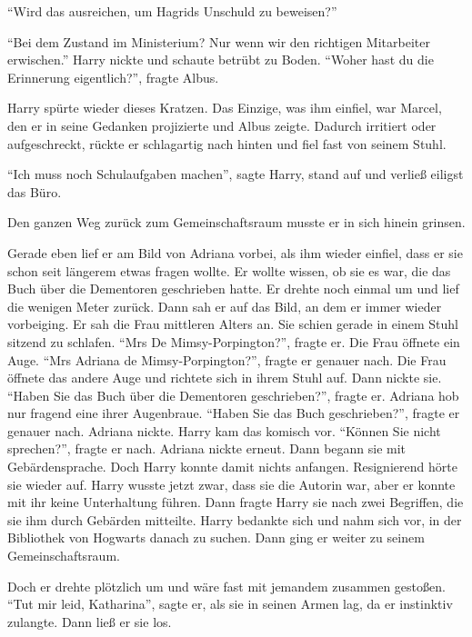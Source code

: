 \enquote{Wird das ausreichen, um Hagrids Unschuld zu beweisen?}

\enquote{Bei dem Zustand im Ministerium? Nur wenn wir den richtigen Mitarbeiter erwischen.} Harry nickte und schaute betrübt zu Boden. \enquote{Woher hast du die Erinnerung eigentlich?}, fragte Albus.

Harry spürte wieder dieses Kratzen. Das Einzige, was ihm einfiel, war Marcel, den er in seine Gedanken projizierte und Albus zeigte. Dadurch irritiert oder aufgeschreckt, rückte er schlagartig nach hinten und fiel fast von seinem Stuhl.

\enquote{Ich muss noch Schulaufgaben machen}, sagte Harry, stand auf und verließ eiligst das Büro.

Den ganzen Weg zurück zum Gemeinschaftsraum musste er in sich hinein grinsen. 

Gerade eben lief er am Bild von Adriana vorbei, als ihm wieder einfiel, dass er sie schon seit längerem etwas fragen wollte. Er wollte wissen, ob sie es war, die das Buch über die Dementoren geschrieben hatte. Er drehte noch einmal um und lief die wenigen Meter zurück. Dann sah er auf das Bild, an dem er immer wieder vorbeiging. Er sah die Frau mittleren Alters an. Sie schien gerade in einem Stuhl sitzend zu schlafen. \enquote{Mrs De Mimsy-Porpington?}, fragte er. Die Frau öffnete ein Auge. \enquote{Mrs Adriana de Mimsy-Porpington?}, fragte er genauer nach. Die Frau öffnete das andere Auge und richtete sich in ihrem Stuhl auf. Dann nickte sie. \enquote{Haben Sie das Buch über die Dementoren geschrieben?}, fragte er. Adriana hob nur fragend eine ihrer Augenbraue. \enquote{Haben Sie das Buch  geschrieben?}, fragte er genauer nach. Adriana nickte. Harry kam das komisch vor. \enquote{Können Sie nicht sprechen?}, fragte er nach. Adriana nickte erneut. Dann begann sie mit Gebärdensprache. Doch Harry konnte damit nichts anfangen. Resignierend hörte sie wieder auf. Harry wusste jetzt zwar, dass sie die Autorin war, aber er konnte mit ihr keine Unterhaltung führen. Dann fragte Harry sie nach zwei Begriffen, die sie ihm durch Gebärden mitteilte. Harry bedankte sich und nahm sich vor, in der Bibliothek von Hogwarts danach zu suchen. Dann ging er weiter zu seinem Gemeinschaftsraum.

Doch er drehte plötzlich um und wäre fast mit jemandem zusammen gestoßen. \enquote{Tut mir leid, Katharina}, sagte er, als sie in seinen Armen lag, da er instinktiv zulangte. Dann ließ er sie los.

